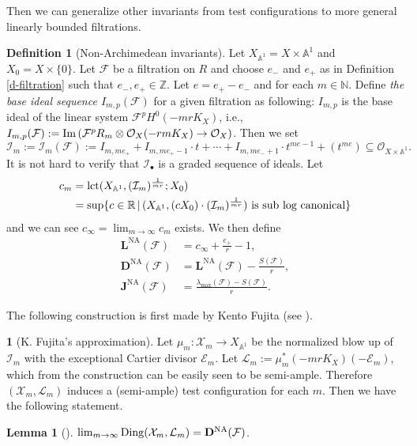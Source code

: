 \documentclass[12pt,reqno]{amsart}%
\newcommand{\bA}{{\mathbb{A} }}
\newcommand{\bN}{{\mathbb{N} }}
\newcommand{\bR}{{\mathbb{R} }}
\newcommand{\bZ}{{\mathbb{Z} }}
\newcommand{\cX}{{\mathcal{X}}}
\newcommand{\cL}{{\mathcal{L}}}
\newcommand{\cF}{\mathcal{F}}
\newcommand{\DNA}{\mathbf{D}^{\mathrm{NA}}}
\newcommand{\JNA}{\mathbf{J}^{\mathrm{NA}}}
\newcommand{\LNA}{\mathbf{L}^{\mathrm{NA}}}
\newcommand{\ord}{{\rm ord}}
\newtheorem{lem}[thm]{Lemma}
\theoremstyle{definition}
\newtheorem{defn}[thm]{Definition}
\newtheorem{say}[thm]{}
\theoremstyle{remark}
\newcommand{\Ding}{{\rm Ding}}
\newcommand{\cO}{{\mathcal{O}}}
\newcommand{\lct}{{\rm lct}}
\newcommand{\cI}{\mathcal{I}}
\begin{document}
Then we can generalize other invariants from test configurations to more general linearly bounded filtrations. 
\begin{defn}[Non-Archimedean invariants] \label{defn:D^NA}
Let $X_{\bA^1}=X \times \bA^1$ and $X_0=X\times \{0\}$. Let $\cF$ be a filtration on $R$ and choose $e_-$ and $e_+$ as in Definition \ref{d-filtration} such that $e_-,e_+\in\bZ$.  Let $e=e_+-e_-$ and for each $m\in\bN$. Define {\it the base ideal sequence $I_{m,p}(\cF)$} for a given filtration as following:  $ I_{m,p} $ is the base ideal of the linear system $\cF^{p}H^0(-mrK_X)$, i.e., $I_{m,p}(\cF):={\rm Im} \left(  \cF^p R_m \otimes \cO_{X}(-rmK_X) \to \cO_X\right)$. Then we set
\[
\cI_m := \cI_m(\cF) := I_{m,me_+} + I_{m,me_+-1}\cdot t + \cdots + I_{m,me_-+1}\cdot t^{me-1} + (t^{me}) \subseteq \cO_{X\times \bA^1}.
\]
It is not hard to verify that $\cI_\bullet$ is a graded sequence of ideals. Let
\begin{align*}
    c_m & = \lct(X_{\bA^1},  (\cI_m)^\frac{1}{mr};X_0)\\
     & = \sup\{ c\in\bR \,|\, (X_{\bA^1}, (cX_0)\cdot (\cI_m)^\frac{1}{mr}) \text{ is sub log canonical} \} 
\end{align*}
and we can see $c_\infty = \lim_{m\to \infty} c_m$ exists. We then define
\begin{align*}
    \LNA(\cF) & = c_\infty + \frac{e_+}{r} -1, \\ 
    \DNA(\cF) & = \LNA(\cF) - \frac{S(\cF)}{r},\\
    \JNA(\cF) & = \frac{\lambda_{\max}(\cF)-S(\cF)}{r}.
\end{align*}
\end{defn}
The following construction is first made by Kento Fujita (see \cite[Sec. 4.2]{Fuj18}). 
\begin{say}[K. Fujita's approximation]
Let $\mu_m\colon \cX_m\to X_{\mathbb{A}^1}$ be the normalized blow up of $\cI_m$ with the exceptional Cartier divisor $\mathcal E_m$. Let $\cL_m:=\mu_m^*(-mrK_X)(-\mathcal E_m)$,
which from the construction can be easily seen to be semi-ample.  Therefore $(\cX_m,\cL_m)$ induces a (semi-ample) test configuration for each $m$. Then we have the following statement.
\end{say}
\begin{lem}[{\cite[Sec. 4]{Fuj18}}] \label{l-dingapproximation}
$\lim_{m\to \infty}\Ding(\cX_m, \cL_m)= \DNA(\cF)$. 
\end{lem}
\end{document}

